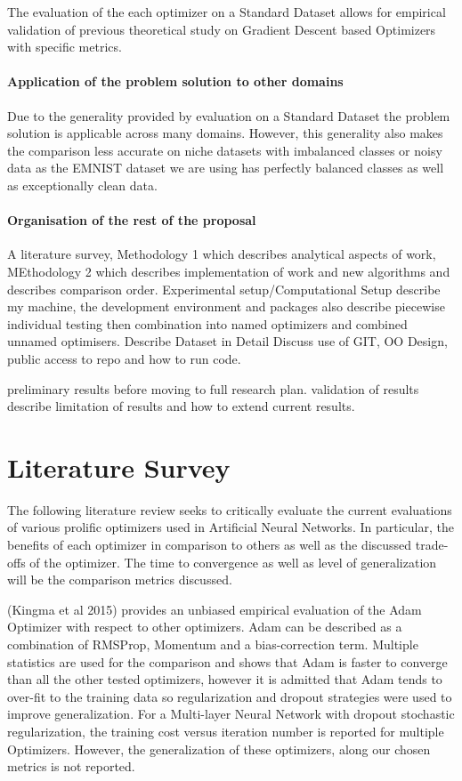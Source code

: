 \documentclass{article}
\begin{document}
	The evaluation of the each optimizer on a Standard Dataset allows for empirical validation of previous theoretical study on Gradient Descent based Optimizers with specific metrics.
	\paragraph{Application of the problem solution to other domains}
	
	Due to the generality provided by evaluation on a Standard Dataset the problem solution is applicable across many domains. However, this generality also makes the comparison less accurate on niche datasets with imbalanced classes or noisy data as the EMNIST dataset we are using has perfectly balanced classes as well as exceptionally clean data. 
	
	
	\paragraph{Organisation of the rest of the proposal}
	
	A literature survey,
	Methodology 1 which describes analytical aspects of work,
	MEthodology 2 which describes implementation of work and new algorithms and describes comparison order.
	Experimental setup/Computational Setup describe my machine, the development environment and packages
	also describe piecewise individual testing then combination into named optimizers and combined unnamed optimisers.
	Describe Dataset in Detail 
	Discuss use of GIT, OO Design, public access to repo and how to run code.
	
	preliminary results before moving to full research plan.
	validation of results
	describe limitation of results and how to extend current results.
	
	
\section{Literature Survey}	
The following literature review seeks to critically evaluate the current evaluations of various prolific optimizers used in Artificial Neural Networks. In particular, the benefits of each optimizer in comparison to others as well as the discussed trade-offs of the optimizer. The time to convergence as well as level of generalization will be the comparison metrics discussed.


(Kingma et al 2015) provides an unbiased empirical evaluation of the Adam Optimizer with respect to other optimizers. Adam can be described as a combination of RMSProp, Momentum and a bias-correction term.
Multiple statistics are used for the comparison and shows that Adam is faster to converge than all the other tested optimizers, however it is admitted that Adam tends to over-fit to the training data so regularization and dropout strategies were used to improve generalization. For a Multi-layer Neural Network with dropout stochastic regularization, the training cost versus iteration number is reported for multiple Optimizers. However, the generalization of these optimizers, along our chosen metrics is not reported.
\end{document}
